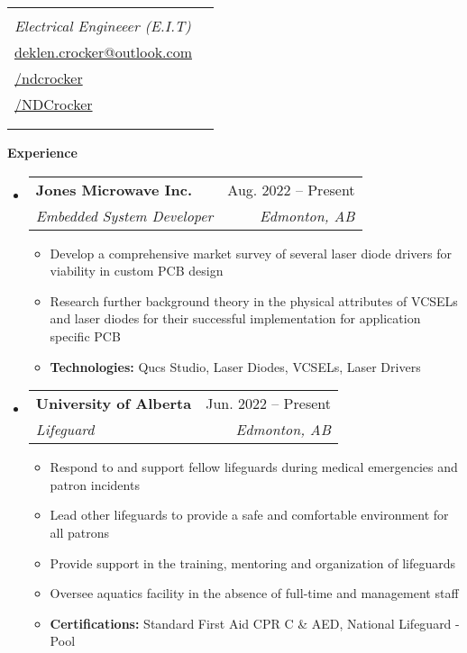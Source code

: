 \documentclass[letterpaper,12pt]{article}[leftmargin=*]
\makeatletter
\def \fullname {Nicolas Deklen Crocker}
\def \subtitle {Electrical Engineeer (E.I.T)}
\def \linkedinicon {\faLinkedin}
\def \linkedinlink {https://linkedin.com/in/ndcrocker/}
\def \linkedintext {/ndcrocker}
\def \phoneicon {\faPhone}
\def \phonetext {+1 (825) 333-4907}
\def \emailicon {\faEnvelope}
\def \emaillink {mailto:deklen.crocker@outlook.com}
\def \emailtext {deklen.crocker@outlook.com}
\def \githubicon {\faGithub}
\def \githublink {https://github.com/NDCrocker}
\def \githubtext {/NDCrocker}
\def \headertype {\singlecol} %
\def \entryspacing {-0pt}
\def \linkedin {\linkedinicon \hspace{3pt}\href{\linkedinlink}{\linkedintext}}
\def \phone {\phoneicon \hspace{3pt}{ \phonetext}}
\def \email {\emailicon \hspace{3pt}\href{\emaillink}{\emailtext}}
\def \github {\githubicon \hspace{3pt}\href{\githublink}{\githubtext}}
\renewcommand{\section}[2]{\vspace{5pt}
  \colorbox{secondary}{\color{white}\raggedbottom\normalsize\textbf{{#1}{\hspace{7pt}#2}}}
}
\newcommand{\resumeEntryStart}{\begin{itemize}[leftmargin=2.5mm]}
\newcommand{\resumeEntryEnd}{\end{itemize}\vspace{\entryspacing}}
\newcommand{\resumeItemListStart}{\begin{itemize}[leftmargin=4.5mm]}
\newcommand{\resumeItemListEnd}{\end{itemize}}
\newcommand{\resumeItem}[1]{
  \item\small{
    {#1 \vspace{-2pt}}
  }
}
\newcommand{\resumeEntryTSDL}[4]{
  \vspace{-1pt}\item[]
    \begin{tabularx}{0.97\textwidth}{X@{\hspace{60pt}}r}
      \textbf{\color{primary}#1} & {\firabook\color{accent}\small#2} \\
      \textit{\color{accent}\small#3} & \textit{\color{accent}\small#4} \\
    \end{tabularx}\vspace{-6pt}
}
\newcommand{\doublecol}[6]{
  \begin{tabularx}{\textwidth}{Xr}
    {
      \begin{tabular}[c]{l}
        \fontsize{35}{45}\selectfont{\color{primary}{{\textbf{\fullname}}}} \\
        {\textit{\subtitle}} %
      \end{tabular}
    } & {
      \begin{tabular}[c]{l@{\hspace{1.5em}}l}
        {\small#4} & {\small#1} \\
        {\small#5} & {\small#2} \\
        {\small#6} & {\small#3}
      \end{tabular}
    }
  \end{tabularx}
}
\newcommand{\singlecol}[6]{
  \begin{tabularx}{\textwidth}{Xr}
    {
      \begin{tabular}[b]{l}
        \fontsize{35}{45}\selectfont{\color{primary}{{\textbf{\fullname}}}} \\
        {\textit{\subtitle}} %
      \end{tabular}
    } & {
      \begin{tabular}[c]{l}
        {\small#1} \\
        {\small#2} \\
        {\small#3} \\
        {\small#4} \\
        {\small#5} \\
        {\small#6}
      \end{tabular}
    }
  \end{tabularx}
}
\makeatother
\begin{document}


\headertype{\phone}{\email}{\linkedin}{\github}{}{} %
\vspace{-25pt} %

\section{\faPieChart}{Experience}

  \resumeEntryStart
    \resumeEntryTSDL
      {Jones Microwave Inc.}{Aug. 2022 -- Present}
      {Embedded System Developer}{Edmonton, AB}
    \resumeItemListStart
      \resumeItem {Develop a comprehensive market survey of several laser diode drivers for viability in custom PCB design}
      \resumeItem {Research further background theory in the physical attributes of VCSELs and laser diodes for their successful
      implementation for application specific PCB}
      \resumeItem {\textbf{Technologies:} Qucs Studio, Laser Diodes, VCSELs, Laser Drivers}
    \resumeItemListEnd
  \resumeEntryEnd

  \resumeEntryStart
  \resumeEntryTSDL
  {University of Alberta}{Jun. 2022 -- Present}
  {Lifeguard}{Edmonton, AB}
      \resumeItemListStart
      \resumeItem {Respond to and support fellow lifeguards during medical emergencies and patron incidents}
      \resumeItem {Lead other lifeguards to provide a safe and comfortable environment for all patrons}
      \resumeItem {Provide support in the training, mentoring and organization of lifeguards}
      \resumeItem {Oversee aquatics facility in the absence of full-time and management staff}
      \resumeItem {\textbf{Certifications:} Standard First Aid CPR C \& AED, National Lifeguard - Pool}
    \resumeItemListEnd
  \resumeEntryEnd

\end{document}
